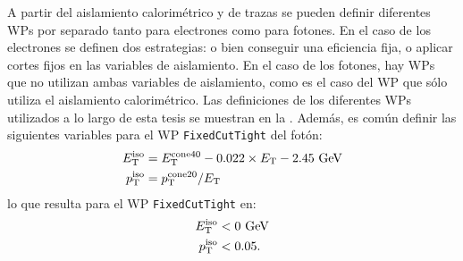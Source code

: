 \begin{table}[ht!]
    \caption{Resumen de los \ac{WP} de aislamiento para electrones y fotones usados a lo largo de esta tesis.}
    \label{fig:objects:egamma:iso:iso_table}
\end{table}

A partir del aislamiento calorimétrico y de trazas se pueden definir diferentes \acp{WP} por separado tanto para electrones como para fotones. En el caso de los electrones se definen dos estrategias: o bien conseguir una eficiencia fija, o aplicar cortes fijos en las variables de aislamiento. En el caso de los fotones, hay \acp{WP} que no utilizan ambas variables de aislamiento, como es el caso del \ac{WP} que sólo utiliza el aislamiento calorimétrico. Las definiciones de los diferentes \acp{WP} utilizados a lo largo de esta tesis se muestran en la \Tab{\ref{fig:objects:egamma:iso:iso_table}}. Además, es común definir las siguientes variables para el \ac{WP} \texttt{FixedCutTight} del fotón:
\begin{align}
    \label{eq:objects:egamma:iso:definitions}
    E_{\text{T}}^{\text{iso}} &= E_{\text{T}}^{\text{cone40}} - 0.022 \times E_{\text{T}} - 2.45~\text{GeV}\\
    p_{\text{T}}^{\text{iso}} &= p_{\text{T}}^{\text{cone20}} / E_{\text{T}}
\end{align}
lo que resulta para el \ac{WP} \texttt{FixedCutTight} en:
\begin{align}
    E_{\text{T}}^{\text{iso}} &< 0 ~\text{GeV}\\
    p_{\text{T}}^{\text{iso}} &< 0.05.
\end{align}















